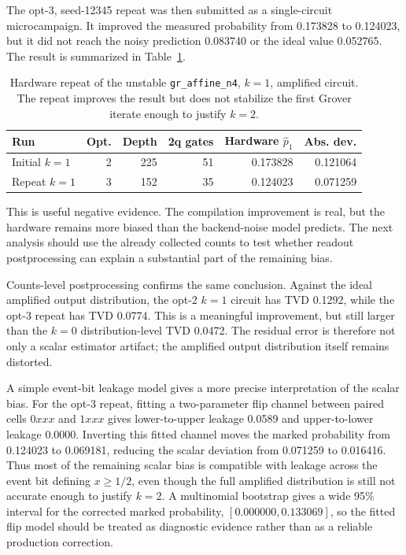 The opt-3, seed-12345 repeat was then submitted as a single-circuit
microcampaign. It improved the measured probability from 0.173828 to 0.124023,
but it did not reach the noisy prediction 0.083740 or the ideal value 0.052765.
The result is summarized in Table~\ref{tab:gr-affine-k1-repeat}.

\begin{table}[h]
\centering
\begin{tabular}{lrrrrr}
\toprule
Run & Opt. & Depth & 2q gates & Hardware \(\hat p_1\) & Abs. dev. \\
\midrule
Initial \(k=1\) & 2 & 225 & 51 & 0.173828 & 0.121064 \\
Repeat \(k=1\) & 3 & 152 & 35 & 0.124023 & 0.071259 \\
\bottomrule
\end{tabular}
\caption{Hardware repeat of the unstable \texttt{gr\_affine\_n4}, \(k=1\),
amplified circuit. The repeat improves the result but does not stabilize the
first Grover iterate enough to justify \(k=2\).}
\label{tab:gr-affine-k1-repeat}
\end{table}

This is useful negative evidence. The compilation improvement is real, but the
hardware remains more biased than the backend-noise model predicts. The next
analysis should use the already collected counts to test whether readout
postprocessing can explain a substantial part of the remaining bias.

Counts-level postprocessing confirms the same conclusion. Against the ideal
amplified output distribution, the opt-2 \(k=1\) circuit has TVD 0.1292, while
the opt-3 repeat has TVD 0.0774. This is a meaningful improvement, but still
larger than the \(k=0\) distribution-level TVD 0.0472. The residual error is
therefore not only a scalar estimator artifact; the amplified output
distribution itself remains distorted.

A simple event-bit leakage model gives a more precise interpretation of the
scalar bias. For the opt-3 repeat, fitting a two-parameter flip channel between
paired cells \(0xxx\) and \(1xxx\) gives lower-to-upper leakage 0.0589 and
upper-to-lower leakage 0.0000. Inverting this fitted channel moves the marked
probability from 0.124023 to 0.069181, reducing the scalar deviation from
0.071259 to 0.016416. Thus most of the remaining scalar bias is compatible with
leakage across the event bit defining \(x\ge 1/2\), even though the full
amplified distribution is still not accurate enough to justify \(k=2\). A
multinomial bootstrap gives a wide 95\% interval for the corrected marked
probability, \([0.000000,0.133069]\), so the fitted flip model should be treated
as diagnostic evidence rather than as a reliable production correction.

